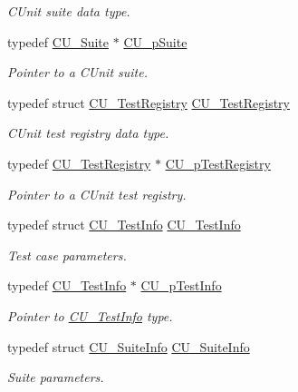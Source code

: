 \begin{DoxyCompactItemize}
\begin{DoxyCompactList}\small\item\em C\+Unit suite data type. \end{DoxyCompactList}\item 
typedef \hyperlink{struct_c_u___suite}{C\+U\+\_\+\+Suite} $\ast$ \hyperlink{group___framework_gaba832ae8b235f5e70d6a4ac9c3bb1219}{C\+U\+\_\+p\+Suite}
\begin{DoxyCompactList}\small\item\em Pointer to a C\+Unit suite. \end{DoxyCompactList}\item 
typedef struct \hyperlink{struct_c_u___test_registry}{C\+U\+\_\+\+Test\+Registry} \hyperlink{group___framework_ga9a7758811da313b88b23c6e6fdc537a0}{C\+U\+\_\+\+Test\+Registry}
\begin{DoxyCompactList}\small\item\em C\+Unit test registry data type. \end{DoxyCompactList}\item 
typedef \hyperlink{struct_c_u___test_registry}{C\+U\+\_\+\+Test\+Registry} $\ast$ \hyperlink{group___framework_ga2a416821761e04581a70c41ae3587d5c}{C\+U\+\_\+p\+Test\+Registry}
\begin{DoxyCompactList}\small\item\em Pointer to a C\+Unit test registry. \end{DoxyCompactList}\item 
typedef struct \hyperlink{struct_c_u___test_info}{C\+U\+\_\+\+Test\+Info} \hyperlink{group___framework_gad5892aef99bf82d4be23b9284531382d}{C\+U\+\_\+\+Test\+Info}
\begin{DoxyCompactList}\small\item\em Test case parameters. \end{DoxyCompactList}\item 
typedef \hyperlink{struct_c_u___test_info}{C\+U\+\_\+\+Test\+Info} $\ast$ \hyperlink{group___framework_ga146a57ac2abef6382399be83afb1daed}{C\+U\+\_\+p\+Test\+Info}
\begin{DoxyCompactList}\small\item\em Pointer to \hyperlink{struct_c_u___test_info}{C\+U\+\_\+\+Test\+Info} type. \end{DoxyCompactList}\item 
typedef struct \hyperlink{struct_c_u___suite_info}{C\+U\+\_\+\+Suite\+Info} \hyperlink{group___framework_ga345177d10f56a80873124d47cae930f0}{C\+U\+\_\+\+Suite\+Info}
\begin{DoxyCompactList}\small\item\em Suite parameters. \end{DoxyCompactList}\item 

\end{DoxyCompactItemize}
